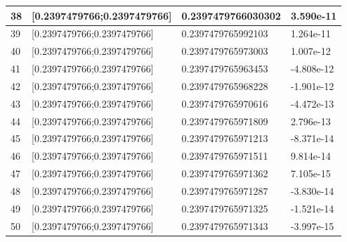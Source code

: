 \documentclass[a4paper, 11pt]{article}
\begin{document}
\begin{table}[H]
\begin{tabular}{llll}
\multicolumn{1}{|l|}{38} & \multicolumn{1}{l|}{{[}0.2397479766;0.2397479766{]}} & \multicolumn{1}{l|}{0.2397479766030302} & \multicolumn{1}{l|}{3.590e-11} \\ \hline
\multicolumn{1}{|l|}{39} & \multicolumn{1}{l|}{{[}0.2397479766;0.2397479766{]}} & \multicolumn{1}{l|}{0.2397479765992103} & \multicolumn{1}{l|}{1.264e-11} \\ \hline
\multicolumn{1}{|l|}{40} & \multicolumn{1}{l|}{{[}0.2397479766;0.2397479766{]}} & \multicolumn{1}{l|}{0.2397479765973003} & \multicolumn{1}{l|}{1.007e-12} \\ \hline
\multicolumn{1}{|l|}{41} & \multicolumn{1}{l|}{{[}0.2397479766;0.2397479766{]}} & \multicolumn{1}{l|}{0.2397479765963453} & \multicolumn{1}{l|}{-4.808e-12} \\ \hline
\multicolumn{1}{|l|}{42} & \multicolumn{1}{l|}{{[}0.2397479766;0.2397479766{]}} & \multicolumn{1}{l|}{0.2397479765968228} & \multicolumn{1}{l|}{-1.901e-12} \\ \hline
\multicolumn{1}{|l|}{43} & \multicolumn{1}{l|}{{[}0.2397479766;0.2397479766{]}} & \multicolumn{1}{l|}{0.2397479765970616} & \multicolumn{1}{l|}{-4.472e-13} \\ \hline
\multicolumn{1}{|l|}{44} & \multicolumn{1}{l|}{{[}0.2397479766;0.2397479766{]}} & \multicolumn{1}{l|}{0.2397479765971809} & \multicolumn{1}{l|}{2.796e-13} \\ \hline
\multicolumn{1}{|l|}{45} & \multicolumn{1}{l|}{{[}0.2397479766;0.2397479766{]}} & \multicolumn{1}{l|}{0.2397479765971213} & \multicolumn{1}{l|}{-8.371e-14} \\ \hline
\multicolumn{1}{|l|}{46} & \multicolumn{1}{l|}{{[}0.2397479766;0.2397479766{]}} & \multicolumn{1}{l|}{0.2397479765971511} & \multicolumn{1}{l|}{9.814e-14} \\ \hline
\multicolumn{1}{|l|}{47} & \multicolumn{1}{l|}{{[}0.2397479766;0.2397479766{]}} & \multicolumn{1}{l|}{0.2397479765971362} & \multicolumn{1}{l|}{7.105e-15} \\ \hline
\multicolumn{1}{|l|}{48} & \multicolumn{1}{l|}{{[}0.2397479766;0.2397479766{]}} & \multicolumn{1}{l|}{0.2397479765971287} & \multicolumn{1}{l|}{-3.830e-14} \\ \hline
\multicolumn{1}{|l|}{49} & \multicolumn{1}{l|}{{[}0.2397479766;0.2397479766{]}} & \multicolumn{1}{l|}{0.2397479765971325} & \multicolumn{1}{l|}{-1.521e-14} \\ \hline
\multicolumn{1}{|l|}{50} & \multicolumn{1}{l|}{{[}0.2397479766;0.2397479766{]}} & \multicolumn{1}{l|}{0.2397479765971343} & \multicolumn{1}{l|}{-3.997e-15} \\ \hline

\end{tabular}
\end{table}
\end{document}
